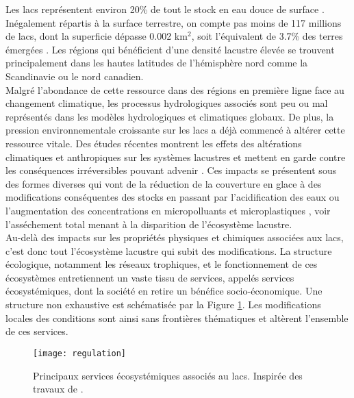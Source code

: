 Les lacs représentent environ 20\% de tout le stock en eau douce de surface \citep{messager2016}. Inégalement répartis à la surface terrestre, on compte pas moins de 117 millions de lacs, dont la superficie dépasse 0.002 km$^{2}$, soit l'équivalent de 3.7\% des terres émergées \citep{verpoorter2014}. Les régions qui bénéficient d'une densité lacustre élevée se trouvent principalement dans les hautes latitudes de l'hémisphère nord comme la Scandinavie ou le nord canadien.\\
Malgré l'abondance de cette ressource dans des régions en première ligne face au changement climatique, les processus hydrologiques associés sont peu ou mal représentés dans les modèles hydrologiques et climatiques globaux. De plus, la pression environnementale croissante sur les lacs a déjà commencé à altérer cette ressource vitale. Des études récentes montrent les effets des altérations climatiques et anthropiques sur les systèmes lacustres et mettent en garde contre les conséquences irréversibles pouvant advenir \citep{woolway2020, jenny2020}. Ces impacts se présentent sous des formes diverses qui vont de la réduction de la couverture en glace \citep{sharma2019} à des modifications conséquentes des stocks \citep{wang2018} en passant par l'acidification des eaux \citep{phillips2015} ou l'augmentation des concentrations en micropolluants et microplastiques \citep{eerkes2015, schwarzenbach2006}, voir l'asséchement total menant à la disparition de l'écosystème lacustre.\\
Au-delà des impacts sur les propriétés physiques et chimiques associées aux lacs, c'est donc tout l'écosystème lacustre qui subit des modifications. La structure écologique, notamment les réseaux trophiques, et le fonctionnement de ces écosystèmes entretiennent un vaste tissu de services, appelés services écosystémiques, dont la société en retire un bénéfice socio-économique. Une structure non exhaustive est schématisée par la Figure \ref{fig:services_eco}. Les modifications locales des conditions sont ainsi sans frontières thématiques et altèrent l'ensemble de ces services.

\begin{figure}[h!]
 \centerline{\texttt{[image: regulation]}}
 \caption{Principaux services écosystémiques associés au lacs. Inspirée des travaux de \citet{schallenberg2013}.}
 \label{fig:services_eco}
\end{figure} 

